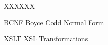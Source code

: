 
\begin{listofabbrv}{XXXXXX}
  \item [BCNF] Boyce Codd Normal Form
  \item [XSLT] XSL Transformations
\end{listofabbrv}
